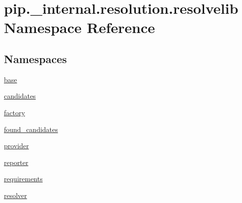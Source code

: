 \hypertarget{namespacepip_1_1__internal_1_1resolution_1_1resolvelib}{}\section{pip.\+\_\+internal.\+resolution.\+resolvelib Namespace Reference}
\label{namespacepip_1_1__internal_1_1resolution_1_1resolvelib}
\subsection*{Namespaces}
\begin{DoxyCompactItemize}
\item 
 \hyperlink{namespacepip_1_1__internal_1_1resolution_1_1resolvelib_1_1base}{base}
\item 
 \hyperlink{namespacepip_1_1__internal_1_1resolution_1_1resolvelib_1_1candidates}{candidates}
\item 
 \hyperlink{namespacepip_1_1__internal_1_1resolution_1_1resolvelib_1_1factory}{factory}
\item 
 \hyperlink{namespacepip_1_1__internal_1_1resolution_1_1resolvelib_1_1found__candidates}{found\+\_\+candidates}
\item 
 \hyperlink{namespacepip_1_1__internal_1_1resolution_1_1resolvelib_1_1provider}{provider}
\item 
 \hyperlink{namespacepip_1_1__internal_1_1resolution_1_1resolvelib_1_1reporter}{reporter}
\item 
 \hyperlink{namespacepip_1_1__internal_1_1resolution_1_1resolvelib_1_1requirements}{requirements}
\item 
 \hyperlink{namespacepip_1_1__internal_1_1resolution_1_1resolvelib_1_1resolver}{resolver}
\end{DoxyCompactItemize}
